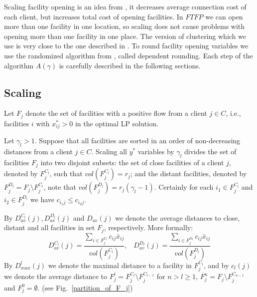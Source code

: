 \documentclass{llncs}
\begin{document}
Scaling facility opening is an idea from \cite{Aardal}, it decreases average connection cost of each client, but increases total cost of opening facilities. In $FTFP$ we can open more than one facility in one location, so scaling does not cause problems with opening more than one facility in one place. The version of clustering which we use is very close to the one described in \cite{Chudak}. To round facility opening variables we use the randomized algorithm from \cite{Aravind}, called dependent rounding. Each step of the algorithm $A(\gamma)$ is carefully described in the following sections.

\subsection{Scaling}

Let $F_j$ denote the set of facilities with a positive flow from a client $j \in C$, i.e., facilities $i$ with $x_{ij}^* > 0$ in the optimal LP solution. 

Let $\gamma_l > 1$. Suppose that all facilities are sorted in an order of non-decreasing distances from a client $j \in C$. Scaling all $y^*$ variables by $\gamma_l$ divides the set of facilities $F_j$ into two disjoint subsets: the set of close facilities of a client $j$, denoted by $F_j^{C_l}$, such that $vol(F_j^{C_l}) = r_j$;  and the distant facilities, denoted by $F_j^{D_l} = F_j \setminus F_j^{C_l}$, note that $vol(F_j^{D_l}) = r_j(\gamma_l - 1)$. Certainly for each $i_1 \in F_j^{C_l}$ and $i_2 \in F_j^{D_l}$ we have $c_{i_{1}j} \leq c_{i_{2}j}$.

By $D_{av}^{C_l}(j), D_{av}^{D_l}(j)$ and $D_{av}(j)$ we denote the average distances to close, distant and all facilities in set $F_j$, respectively. More formally: $$D_{av}^{C_l}(j) = \frac{\sum_{i \in F_j^{C_l}} c_{ij} \bar{x}_{ij}}{vol(F_j^{C_l})}, \; \; \; D_{av}^{D_l}(j) = \frac{\sum_{i \in F_j^{D_l}} c_{ij} \bar{x}_{ij}}{vol(F_j^{D_l})}$$ By $D_{max}^l(j)$ we denote the maximal distance to a facility in $F_j^{C_l}$, and by $c_l(j)$ we denote the average distance to $F_j^l = F_j^{C_l} \setminus F_j^{C_{l-1}}$ for $n > l \geq 1$, $F_j^n = F_j \setminus F_j^{C_{n-1}}$ and $F_j^0 = \emptyset$. (see Fig.~\ref{partition_of_F_j})
\end{document}
